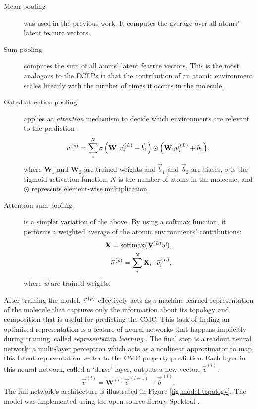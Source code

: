 \begin{description}
    \item[Mean pooling] was used in the previous work. It computes the average
          over all atoms' latent feature vectors.
    \item[Sum pooling] computes the sum of all atoms' latent feature vectors.
          This is the most analogous to the ECFPs in that the contribution of an
          atomic environment scales linearly with the number of times it occurs
          in the molecule.
    \item[Gated attention pooling] applies an \emph{attention} mechanism to decide which environments
          are relevant to the prediction \cite{liGatedGraphSequence2017}:
          \begin{equation}
              \vec{v}^{\,(p)}{} = \sum_i^N \sigma\left(\mathbf{W}_1 \vec{v}_i^{\,(L)} + \vec{b}_1 \right) \odot \left(\mathbf{W}_2 \vec{v}_i^{\,(L)} + \vec{b}_2 \right),
          \end{equation}
          where $\mathbf{W}_1$ and $\mathbf{W}_2$ are trained weights and
          $\vec{b}_1$ and $\vec{b}_2$ are biases, $\sigma$ is the sigmoid
          activation function, $N$ is the number of atoms in the molecule, and
          $\odot$ represents element-wise multiplication.
    \item[Attention sum pooling] is a simpler variation of the above. By using a
          softmax function, it performs a weighted average of the atomic environments'
          contributions:
          \begin{align}
              \mathbf{X} = \mathrm{softmax}(\mathbf{V}^{(L)}\vec{w}), \\
              \vec{v}^{\,(p)}{} = \sum_i^N \mathbf{X}_i \cdot \vec{v}^{\,(L)}_i,
          \end{align}
          where $\vec{w}$ are trained weights.
\end{description}

After training the model, $\vec{v}^{\,(p)}{}$ effectively acts as a machine-learned
representation of the molecule that captures only the information about its
topology and composition that is useful for predicting the CMC. This task of
finding an optimised representation is a feature of neural networks that happens
implicitly during training, called \emph{representation learning}
\cite{goodfellowDeepLearning2016a}. The final step is a readout neural network:
a multi-layer perceptron which acts as a nonlinear approximator to map this
latent representation vector to the CMC property prediction. Each layer in this
neural network, called a `dense' layer, outputs a new vector, $\vec{v}^{(l)}$:
\begin{equation}
    \vec{v}^{(l)} = \mathbf{W}^{(l)}\vec{v}^{\,(l-1)} + \vec{b}^{\,(l)},
\end{equation}
The full network's architecture is illustrated in Figure
\ref{fig:model-topology}. The model was implemented using the open-source
library Spektral \cite{grattarolaGraphNeuralNetworks2020}.

